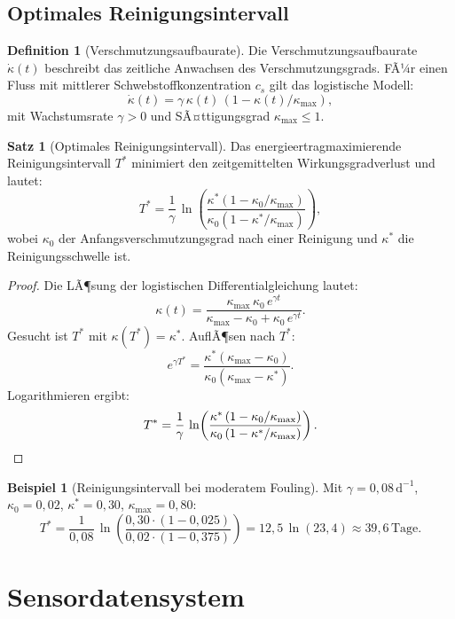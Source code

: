 ﻿\documentclass[a4paper,12pt]{article}
\theoremstyle{definition}
\newtheorem{definition}{Definition}
\newtheorem{beispiel}{Beispiel}
\newtheorem{satz}{Satz}
\begin{document}
\subsection{Optimales Reinigungsintervall}

\begin{definition}[Verschmutzungsaufbaurate]
Die Verschmutzungsaufbaurate $\dot{\kappa}(t)$ beschreibt das zeitliche Anwachsen des
Verschmutzungsgrads. FÃ¼r einen Fluss mit mittlerer Schwebstoffkonzentration $c_s$
gilt das logistische Modell:
\[
  \dot{\kappa}(t) = \gamma\,\kappa(t)\,(1 - \kappa(t)/\kappa_{\max}),
\]
mit Wachstumsrate $\gamma > 0$ und SÃ¤ttigungsgrad $\kappa_{\max} \leq 1$.
\end{definition}

\begin{satz}[Optimales Reinigungsintervall]
\label{satz:reinigung}
Das energieertragmaximierende Reinigungsintervall $T^*$ minimiert den zeitgemittelten
Wirkungsgradverlust und lautet:
\[
  T^* = \frac{1}{\gamma}\,\ln\!\left(\frac{\kappa^*(1 - \kappa_0/\kappa_{\max})}
       {\kappa_0(1 - \kappa^*/\kappa_{\max})}\right),
\]
wobei $\kappa_0$ der Anfangsverschmutzungsgrad nach einer Reinigung und $\kappa^*$ die
Reinigungsschwelle ist.
\end{satz}

\begin{proof}
Die LÃ¶sung der logistischen Differentialgleichung lautet:
\[
  \kappa(t) = \frac{\kappa_{\max}\,\kappa_0\,e^{\gamma t}}
              {\kappa_{\max} - \kappa_0 + \kappa_0\,e^{\gamma t}}.
\]
Gesucht ist $T^*$ mit $\kappa(T^*) = \kappa^*$. AuflÃ¶sen nach $T^*$:
\[
  e^{\gamma T^*} = \frac{\kappa^*(\kappa_{\max} - \kappa_0)}{\kappa_0(\kappa_{\max} - \kappa^*)}.
\]
Logarithmieren ergibt:
\[
  T^* = \frac{1}{\gamma}\,\ln\!\left(\frac{\kappa^*\,(1 - \kappa_0/\kappa_{\max})}
       {\kappa_0\,(1 - \kappa^*/\kappa_{\max})}\right). \qedhere
\]
\end{proof}

\begin{beispiel}[Reinigungsintervall bei moderatem Fouling]
Mit $\gamma = 0{,}08\,\mathrm{d}^{-1}$, $\kappa_0 = 0{,}02$, $\kappa^* = 0{,}30$,
$\kappa_{\max} = 0{,}80$:
\[
  T^* = \frac{1}{0{,}08}\,\ln\!\left(\frac{0{,}30 \cdot (1 - 0{,}025)}
       {0{,}02 \cdot (1 - 0{,}375)}\right)
     = 12{,}5\,\ln(23{,}4) \approx 39{,}6\,\mathrm{Tage}.
\]
\end{beispiel}

\section{Sensordatensystem}
\end{document}
